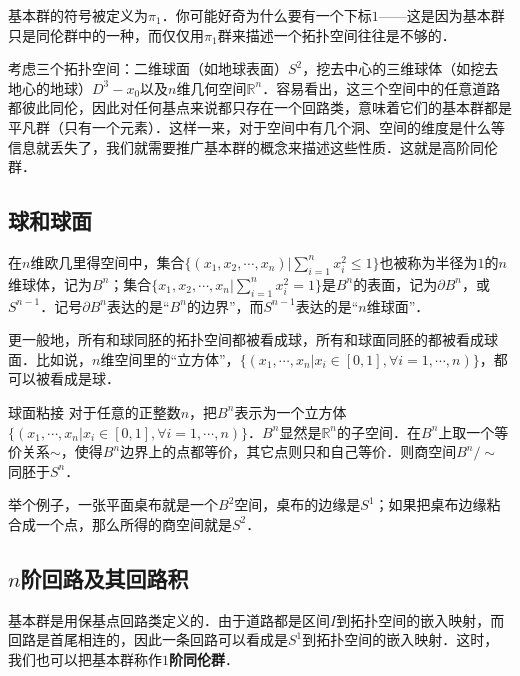


基本群的符号被定义为$\pi_1$．你可能好奇为什么要有一个下标$1$——这是因为基本群只是同伦群中的一种，而仅仅用$\pi_1$群来描述一个拓扑空间往往是不够的．

考虑三个拓扑空间：二维球面（如地球表面）$S^2$，挖去中心的三维球体（如挖去地心的地球）$D^3-x_0$以及$n$维几何空间$\mathbb{R}^n$．容易看出，这三个空间中的任意道路都彼此同伦，因此对任何基点来说都只存在一个回路类，意味着它们的基本群都是平凡群（只有一个元素）．这样一来，对于空间中有几个洞、空间的维度是什么等信息就丢失了，我们就需要推广基本群的概念来描述这些性质．这就是高阶同伦群．

\subsection{球和球面}
在$n$维欧几里得空间中，集合$\{(x_1, x_2,\cdots,x_n)|\sum^n_{i=1}x_i^2\leq 1\}$也被称为半径为$1$的$n$维球体，记为$B^n$；集合$\{x_1, x_2, \cdots, x_n|\sum^n_{i=1}x_i^2=1\}$是$B^n$的表面，记为$\partial B^n$，或$S^{n-1}$．记号$\partial B^n$表达的是“$B^n$的边界”，而$S^{n-1}$表达的是“$n$维球面”．

更一般地，所有和球同胚的拓扑空间都被看成球，所有和球面同胚的都被看成球面．比如说，$n$维空间里的“立方体”，$\{(x_1, \cdots, x_n|x_i\in[0, 1], \forall i=1, \cdots, n)\}$，都可以被看成是球．

\begin{theorem}{球面粘接}
对于任意的正整数$n$，把$B^n$表示为一个立方体$\{(x_1, \cdots, x_n|x_i\in[0, 1], \forall i=1, \cdots, n)\}$．$B^n$显然是$\mathbb{R}^n$的子空间．在$B^n$上取一个等价关系$\sim$，使得$B^n$边界上的点都等价，其它点则只和自己等价．则商空间$B^n/\sim$同胚于$S^n$．
\end{theorem}

举个例子，一张平面桌布就是一个$B^2$空间，桌布的边缘是$S^1$；如果把桌布边缘粘合成一个点，那么所得的商空间就是$S^2$．

\subsection{$n$阶回路及其回路积}

基本群是用保基点回路类定义的．由于道路都是区间$I$到拓扑空间的嵌入映射，而回路是首尾相连的，因此一条回路可以看成是$S^1$到拓扑空间的嵌入映射．这时，我们也可以把基本群称作$1$\textbf{阶同伦群}．

